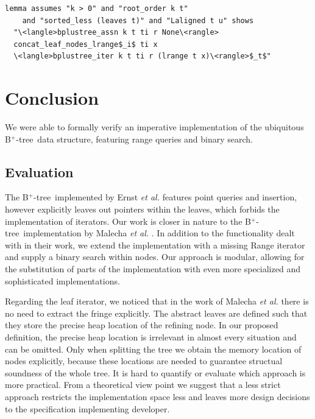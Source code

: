 \documentclass[runningheads]{llncs}
\newcommand{\btree}{B$^+$-tree}
\begin{document}
\begin{lstlisting}[mathescape=true, language=Isabelle,label=lst:btree-leaves-range]
lemma assumes "k > 0" and "root_order k t" 
    and "sorted_less (leaves t)" and "Laligned t u" shows 
  "\<langle>bplustree_assn k t ti r None\<rangle>
  concat_leaf_nodes_lrange$_i$ ti x
  \<langle>bplustree_iter k t ti r (lrange t x)\<rangle>$_t$"
\end{lstlisting}



\section{Conclusion}
\label{sec:conclusion}

We were able to formally verify an imperative implementation
of the ubiquitous \btree\ data structure, featuring range queries and binary search.


\subsection{Evaluation}


The \btree\ implemented by Ernst \emph{et al.} \cite{DBLP:journals/sosym/ErnstSR15} features point queries and insertion,
however explicitly leaves out pointers within the leaves,
which forbids the implementation of iterators.
Our work is closer in nature to the \btree\ implementation by Malecha \emph{et al.} \cite{DBLP:conf/popl/MalechaMSW10}.
In addition to the functionality dealt with in their work, we extend
the implementation with a missing Range iterator
and supply a binary search within nodes.
Our approach is modular, allowing for the substitution of parts
of the implementation with even more specialized and sophisticated implementations.

Regarding the leaf iterator, we noticed that in the work of Malecha \emph{et al.}
there is no need to extract the fringe explicitly.
The abstract leaves are defined such that they store the precise heap location of the refining node.
In our proposed definition, the precise heap location is irrelevant in almost every situation and can be omitted.
Only when splitting the tree we obtain the memory location
of nodes explicitly, because these locations are needed to guarantee
structual soundness of the whole tree.
It is hard to quantify or evaluate which approach is more practical.
From a theoretical view point we suggest that a less strict approach restricts the implementation space less
and leaves more design decisions to the specification implementing developer.
\end{document}
